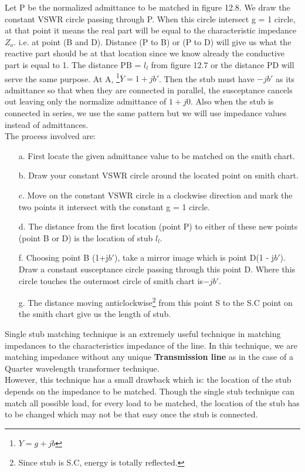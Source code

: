 Let P be the normalized admittance to be matched in figure 12.8. We draw the constant VSWR circle passing through P. When this circle intersect g = 1 circle, at that point it means the real part will be equal to the characteristic impedance $Z_o$. i.e. at point (B and D). Distance (P to B) or (P to D) will give us what the reactive
part should be at that location since we know already the conductive part is equal to 1. The distance PB = $l_l$ from figure 12.7 or the distance PD will serve the same purpose. At A, \footnote{$Y = g + jb$}$\overline{Y} = 1 + jb' $. Then the stub must have $-jb'$ as its admittance so that when they are connected in parallel, the susceptance cancels out leaving only the normalize admittance of $1 + j0$.
Also when the stub is connected in series, we use the same pattern but we will use impedance values instead of admittances.\\
The process involved are:\\
\begin{itemize}
\item[a.]First locate the given admittance value to be matched on the smith chart.
\item[b.]Draw your constant VSWR circle  around the located point on smith chart.
\item[c.] Move on the constant VSWR circle in a clockwise direction and mark the two points it intersect with the constant g = 1 circle.
\item[d.]The distance from the first location (point P) to either of these new points (point B or D) is the location of stub $l_l$.
\item[f.] Choosing point B (1+j$b'$), take a mirror image which is point D(1 - j$b'$). Draw a constant susceptance circle passing through this point D. Where this circle touches the outermost circle of smith chart is$ -jb'$.
\item[g.] The distance moving anticlockwise\footnote{Since stub is S.C, energy is totally reflected.} from this point S to the S.C point on the smith chart give us the length of stub.
\end{itemize}

Single stub matching technique is an extremely useful technique in matching impedances to the characteristics impedance of the line. In this technique, we are matching impedance without any unique \textbf{Transmission line} as in the case of a Quarter wavelength transformer technique.\\

However, this technique has a small drawback which is: the location of the stub  depends on the impedance to be matched. Though the single stub technique can match all possible load, for every load to be matched, the location of the stub has to be changed which may not be that easy once the stub is connected.\\

